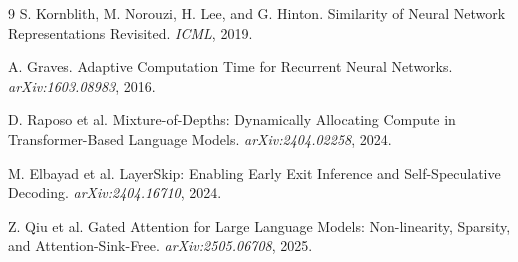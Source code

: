 \documentclass[10pt]{article}
\begin{document}
\begin{thebibliography}{9}
S. Kornblith, M. Norouzi, H. Lee, and G. Hinton.
\newblock Similarity of Neural Network Representations Revisited.
\newblock \emph{ICML}, 2019.

A. Graves.
\newblock Adaptive Computation Time for Recurrent Neural Networks.
\newblock \emph{arXiv:1603.08983}, 2016.

D. Raposo et al.
\newblock Mixture-of-Depths: Dynamically Allocating Compute in Transformer-Based Language Models.
\newblock \emph{arXiv:2404.02258}, 2024.

M. Elbayad et al.
\newblock LayerSkip: Enabling Early Exit Inference and Self-Speculative Decoding.
\newblock \emph{arXiv:2404.16710}, 2024.

Z. Qiu et al.
\newblock Gated Attention for Large Language Models: Non-linearity, Sparsity, and Attention-Sink-Free.
\newblock \emph{arXiv:2505.06708}, 2025.
\end{thebibliography}
\end{document}
